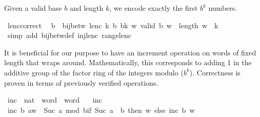\begin{isabellebody}
\begin{isamarkuptext}%
Given a valid base $b$ and length $k$, we encode exactly the first $b^k$ numbers.%
\end{isamarkuptext}\isamarkuptrue%
\isamarkupfalse%
\ lenc{\isacharunderscore}{\kern0pt}correct{\isacharcolon}{\kern0pt}\isanewline
\ \ {\isachardoublequoteopen}{}{\isasymle}b\ {\isasymLongrightarrow}\ bij{\isacharunderscore}{\kern0pt}betw\ {\isacharparenleft}{\kern0pt}lenc\ k\ b{\isacharparenright}{\kern0pt}\ {\isacharbraceleft}{\kern0pt}{\isachardot}{\kern0pt}{\isachardot}{\kern0pt}{\isacharless}{\kern0pt}b{\isacharcircum}{\kern0pt}k{\isacharbraceright}{\kern0pt}\ {\isacharbraceleft}{\kern0pt}w{\isachardot}{\kern0pt}\ valid\ b\ w\ {\isasymand}\ length\ w\ {\isacharequal}{\kern0pt}\ k{\isacharbraceright}{\kern0pt}{\isachardoublequoteclose}\isanewline
%
\isadelimproof
\ \ %
\endisadelimproof
%
\isatagproof
{}\isamarkupfalse%
\ {\isacharparenleft}{\kern0pt}simp\ add{\isacharcolon}{\kern0pt}\ bij{\isacharunderscore}{\kern0pt}betw{\isacharunderscore}{\kern0pt}def\ inj{\isacharunderscore}{\kern0pt}lenc\ range{\isacharunderscore}{\kern0pt}lenc{\isacharparenright}{\kern0pt}%
\endisatagproof
{\isafoldproof}%
%
\isadelimproof
%
\endisadelimproof
%
\isadelimdocument
%
\endisadelimdocument
%
\isatagdocument
%
\isamarkuptrue%
%
\endisatagdocument
{\isafolddocument}%
%
\isadelimdocument
%
\endisadelimdocument
%
\begin{isamarkuptext}%
It is beneficial for our purpose to have an increment operation on
  words of fixed length that wraps around.
Mathematically, this corresponds to adding 1 in the additive group
  of the factor ring of the integers modulo ($b^k$).
Correctness is proven in terms of previously verified operations.%
\end{isamarkuptext}\isamarkuptrue%
\isamarkupfalse%
\ inc\ {\isacharcolon}{\kern0pt}{\isacharcolon}{\kern0pt}\ {\isachardoublequoteopen}nat\ {\isasymRightarrow}\ word\ {\isasymRightarrow}\ word{\isachardoublequoteclose}\ \isanewline
\ \ {\isachardoublequoteopen}inc\ {\isacharunderscore}{\kern0pt}\ {\isacharbrackleft}{\kern0pt}{\isacharbrackright}{\kern0pt}\ {\isacharequal}{\kern0pt}\ {\isacharbrackleft}{\kern0pt}{\isacharbrackright}{\kern0pt}{\isachardoublequoteclose}\isanewline
{\isacharbar}{\kern0pt}\ {\isachardoublequoteopen}inc\ b\ {\isacharparenleft}{\kern0pt}a{\isacharhash}{\kern0pt}w{\isacharparenright}{\kern0pt}\ {\isacharequal}{\kern0pt}\ Suc\ a\ mod\ b{\isacharhash}{\kern0pt}{\isacharparenleft}{\kern0pt}if\ Suc\ a\ {\isasymnoteq}\ b\ then\ w\ else\ inc\ b\ w{\isacharparenright}{\kern0pt}{\isachardoublequoteclose}\isanewline

\end{isabellebody}

